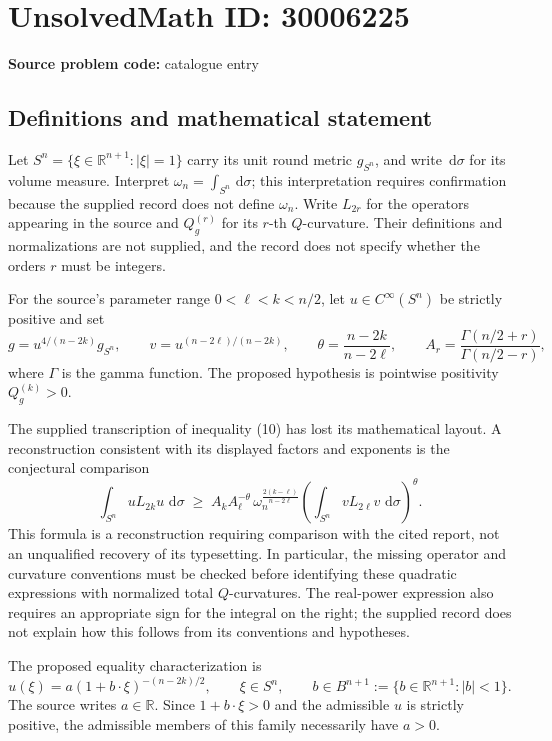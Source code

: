 \documentclass[11pt]{article}
\newcommand{\R}{\mathbb{R}}
\newcommand{\dd}{\,\mathrm{d}}
\begin{document}
\section*{UnsolvedMath ID: 30006225}
\textbf{Source problem code:} catalogue entry
\subsection{Definitions and mathematical statement}
Let \(S^n=\{\xi\in\R^{n+1}:|\xi|=1\}\) carry its unit round metric \(g_{S^n}\), and write \(\dd\sigma\) for its volume measure. Interpret \(\omega_n=\int_{S^n}\dd\sigma\); this interpretation requires confirmation because the supplied record does not define \(\omega_n\). Write \(L_{2r}\) for the operators appearing in the source and \(Q^{(r)}_g\) for its \(r\)-th \(Q\)-curvature. Their definitions and normalizations are not supplied, and the record does not specify whether the orders \(r\) must be integers.

For the source's parameter range \(0<\ell<k<n/2\), let \(u\in C^\infty(S^n)\) be strictly positive and set
\[
g=u^{4/(n-2k)}g_{S^n},\qquad v=u^{(n-2\ell)/(n-2k)},\qquad \theta=\frac{n-2k}{n-2\ell},\qquad A_r=\frac{\Gamma(n/2+r)}{\Gamma(n/2-r)},
\]
where \(\Gamma\) is the gamma function. The proposed hypothesis is pointwise positivity \(Q^{(k)}_g>0\).

The supplied transcription of inequality (10) has lost its mathematical layout. A reconstruction consistent with its displayed factors and exponents is the conjectural comparison
\[
\int_{S^n}uL_{2k}u\,\dd\sigma
\;\geq\;
A_k A_\ell^{-\theta}\,\omega_n^{\frac{2(k-\ell)}{n-2\ell}}
\left(\int_{S^n}vL_{2\ell}v\,\dd\sigma\right)^\theta.
\]
This formula is a reconstruction requiring comparison with the cited report, not an unqualified recovery of its typesetting. In particular, the missing operator and curvature conventions must be checked before identifying these quadratic expressions with normalized total \(Q\)-curvatures. The real-power expression also requires an appropriate sign for the integral on the right; the supplied record does not explain how this follows from its conventions and hypotheses.

The proposed equality characterization is
\[
u(\xi)=a(1+b\cdot\xi)^{-(n-2k)/2},\qquad \xi\in S^n,\qquad b\in B^{n+1}:=\{b\in\R^{n+1}:|b|<1\}.
\]
The source writes \(a\in\R\). Since \(1+b\cdot\xi>0\) and the admissible \(u\) is strictly positive, the admissible members of this family necessarily have \(a>0\).
\end{document}
